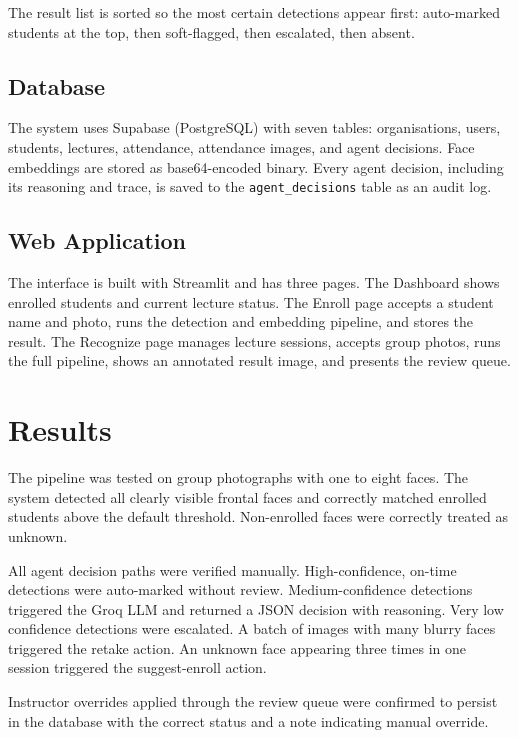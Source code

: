 \documentclass[conference]{IEEEtran}
\begin{document}
The result list is sorted so the most certain detections appear first: auto-marked students at the top, then soft-flagged, then escalated, then absent.

\subsection{Database}

The system uses Supabase (PostgreSQL) with seven tables: organisations, users, students, lectures, attendance, attendance images, and agent decisions. Face embeddings are stored as base64-encoded binary. Every agent decision, including its reasoning and trace, is saved to the \texttt{agent\_decisions} table as an audit log.

\subsection{Web Application}

The interface is built with Streamlit and has three pages. The Dashboard shows enrolled students and current lecture status. The Enroll page accepts a student name and photo, runs the detection and embedding pipeline, and stores the result. The Recognize page manages lecture sessions, accepts group photos, runs the full pipeline, shows an annotated result image, and presents the review queue.

\section{Results}

The pipeline was tested on group photographs with one to eight faces. The system detected all clearly visible frontal faces and correctly matched enrolled students above the default threshold. Non-enrolled faces were correctly treated as unknown.

All agent decision paths were verified manually. High-confidence, on-time detections were auto-marked without review. Medium-confidence detections triggered the Groq LLM and returned a JSON decision with reasoning. Very low confidence detections were escalated. A batch of images with many blurry faces triggered the retake action. An unknown face appearing three times in one session triggered the suggest-enroll action.

Instructor overrides applied through the review queue were confirmed to persist in the database with the correct status and a note indicating manual override.
\end{document}
